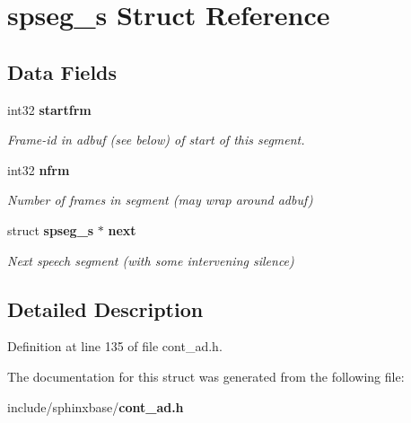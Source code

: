 \section{spseg\-\_\-s Struct Reference}
\label{structspseg__s}
\subsection*{Data Fields}
\begin{DoxyCompactItemize}
\item 
int32 {\bf startfrm}\label{structspseg__s_a0f62769ff904df2d374b9500a210374f}

\begin{DoxyCompactList}\small\item\em Frame-\/id in adbuf (see below) of start of this segment. \end{DoxyCompactList}\item 
int32 {\bf nfrm}\label{structspseg__s_a91271dd1e4a57bfe1c468e216f7dd42f}

\begin{DoxyCompactList}\small\item\em Number of frames in segment (may wrap around adbuf) \end{DoxyCompactList}\item 
struct {\bf spseg\-\_\-s} $\ast$ {\bf next}\label{structspseg__s_aec01e1c543395710d3510e18f0938b1a}

\begin{DoxyCompactList}\small\item\em Next speech segment (with some intervening silence) \end{DoxyCompactList}\end{DoxyCompactItemize}


\subsection{Detailed Description}


Definition at line 135 of file cont\-\_\-ad.\-h.



The documentation for this struct was generated from the following file\-:\begin{DoxyCompactItemize}
\item 
include/sphinxbase/{\bf cont\-\_\-ad.\-h}\end{DoxyCompactItemize}
